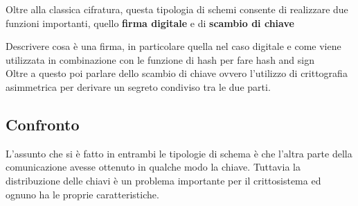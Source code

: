 Oltre alla classica cifratura, questa tipologia di schemi consente di realizzare due funzioni importanti, quello \textbf{firma digitale} e di \textbf{scambio di chiave}

Descrivere cosa è una firma, in particolare quella nel caso digitale e come viene utilizzata in combinazione con le funzione di hash per fare hash and sign\\

Oltre a questo poi parlare dello scambio di chiave ovvero l'utilizzo di crittografia asimmetrica per derivare un segreto condiviso tra le due parti.



\begin{figure}[htbp]
    \centering
    \label{}
    \caption{}
\end{figure}

\subsection{Confronto}

L'assunto che si è fatto in entrambi le tipologie di schema è che l'altra parte della comunicazione avesse ottenuto in qualche modo la chiave. Tuttavia la distribuzione
delle chiavi è un problema importante per il crittosistema ed ognuno ha le proprie caratteristiche. \\


